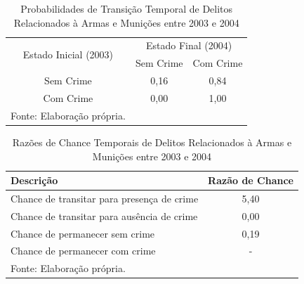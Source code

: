 \documentclass[12pt,openright,oneside,a4paper,english,french,spanish]{abntex2}
\numberwithin{table}{section} %
\numberwithin{figure}{section} %
\begin{document}
\begin{subappendices}
\begin{table}[H]
\centering
\caption{Probabilidades de Transição Temporal de Delitos Relacionados à Armas e Munições entre 2003 e 2004}
        \begin{tabular}{ccc}
            \hline
            \multirow{2}{*}{Estado Inicial (2003)} & \multicolumn{2}{c}{Estado Final (2004)}  \\\cline{2-3} 
                                     & \multicolumn{1}{l}{Sem Crime} & \multicolumn{1}{l}{Com Crime} \\\hline
            {Sem Crime} & {0,16} & {0,84} \\                \hline
            {Com Crime} & {0,00} & {1,00} \\                \hline
            \tiny Fonte: Elaboração própria.
        \end{tabular}
    \label{tab:prob_tempo_rel_arma_2003_2004}
\end{table}

\begin{table}[H]
\centering
\caption{Razões de Chance Temporais de Delitos Relacionados à Armas e Munições entre 2003 e 2004}
        \begin{tabular}{lc}
            \hline
            {\textbf{Descrição}} & {\textbf{Razão de Chance}} \\\hline
            {Chance de transitar para presença de crime} & {5,40} \\
            {Chance de transitar para ausência de crime} & {0,00} \\
            {Chance de permanecer sem crime} & {0,19} \\
            {Chance de permanecer com crime} & {-} \\\hline
            \tiny Fonte: Elaboração própria.
        \end{tabular}
    \label{tab:odds_tempo_rel_arma_2003_2004}
\end{table}



\end{subappendices}
\end{document}
